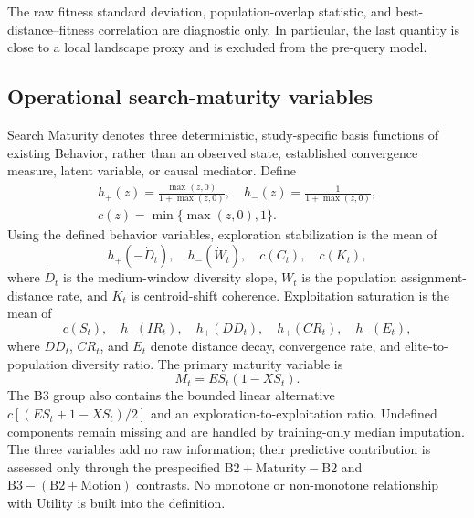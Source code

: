 The raw fitness standard deviation, population-overlap statistic, and best-distance--fitness correlation are diagnostic only.  In particular, the last quantity is close to a local landscape proxy and is excluded from the pre-query model.

\subsection{Operational search-maturity variables}

Search Maturity denotes three deterministic, study-specific basis functions of existing Behavior, rather than an observed state, established convergence measure, latent variable, or causal mediator.  Define
\begin{equation}
\begin{gathered}
  h_+(z)=\frac{\max(z,0)}{1+\max(z,0)},\quad
  h_-(z)=\frac{1}{1+\max(z,0)},\\
  c(z)=\min\{\max(z,0),1\}.
\end{gathered}
\end{equation}
Using the defined behavior variables, exploration stabilization is the mean of
\begin{equation}
  h_+(-\dot D_t),\quad
  h_-(\dot W_t),\quad
  c(C_t),\quad
  c(K_t),
  \label{eq:exploration-stabilization}
\end{equation}
where $\dot D_t$ is the medium-window diversity slope, $\dot W_t$ is the population assignment-distance rate, and $K_t$ is centroid-shift coherence.  Exploitation saturation is the mean of
\begin{equation}
  c(S_t),\quad
  h_-(IR_t),\quad
  h_+(DD_t),\quad
  h_+(CR_t),\quad
  h_-(E_t),
  \label{eq:exploitation-saturation}
\end{equation}
where $DD_t$, $CR_t$, and $E_t$ denote distance decay, convergence rate, and elite-to-population diversity ratio.  The primary maturity variable is
\begin{equation}
  M_t=ES_t(1-XS_t).
  \label{eq:search-maturity}
\end{equation}
The B3 group also contains the bounded linear alternative $c[(ES_t+1-XS_t)/2]$ and an exploration-to-exploitation ratio.  Undefined components remain missing and are handled by training-only median imputation.  The three variables add no raw information; their predictive contribution is assessed only through the prespecified $\mathrm{B2{+}Maturity}-\mathrm{B2}$ and $\mathrm{B3}-(\mathrm{B2{+}Motion})$ contrasts.  No monotone or non-monotone relationship with Utility is built into the definition.

